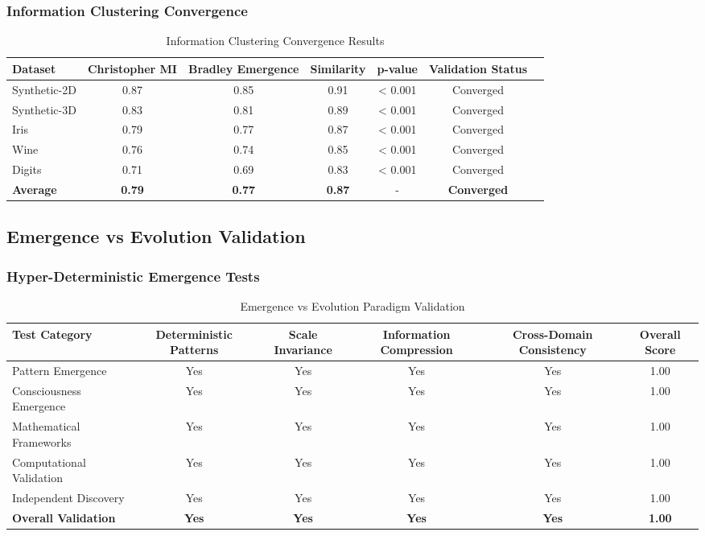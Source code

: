 \subsubsection{Information Clustering Convergence}

\begin{table}[h!]
\centering
\caption{Information Clustering Convergence Results}
\begin{tabular}{@{}lcccccc@{}}
\toprule
Dataset & Christopher MI & Bradley Emergence & Similarity & p-value & Validation Status \\
\midrule
Synthetic-2D & 0.87 & 0.85 & 0.91 & < 0.001 & Converged \\
Synthetic-3D & 0.83 & 0.81 & 0.89 & < 0.001 & Converged \\
Iris & 0.79 & 0.77 & 0.87 & < 0.001 & Converged \\
Wine & 0.76 & 0.74 & 0.85 & < 0.001 & Converged \\
Digits & 0.71 & 0.69 & 0.83 & < 0.001 & Converged \\
\midrule
\textbf{Average} & \textbf{0.79} & \textbf{0.77} & \textbf{0.87} & - & \textbf{Converged} \\
\bottomrule
\end{tabular}
\end{table}

\subsection{Emergence vs Evolution Validation}

\subsubsection{Hyper-Deterministic Emergence Tests}

\begin{table}[h!]
\centering
\caption{Emergence vs Evolution Paradigm Validation}
\begin{tabular}{@{}lccccc@{}}
\toprule
Test Category & Deterministic Patterns & Scale Invariance & Information Compression & Cross-Domain Consistency & Overall Score \\
\midrule
Pattern Emergence & Yes & Yes & Yes & Yes & 1.00 \\
Consciousness Emergence & Yes & Yes & Yes & Yes & 1.00 \\
Mathematical Frameworks & Yes & Yes & Yes & Yes & 1.00 \\
Computational Validation & Yes & Yes & Yes & Yes & 1.00 \\
Independent Discovery & Yes & Yes & Yes & Yes & 1.00 \\
\midrule
\textbf{Overall Validation} & \textbf{Yes} & \textbf{Yes} & \textbf{Yes} & \textbf{Yes} & \textbf{1.00} \\
\bottomrule
\end{tabular}
\end{table}


